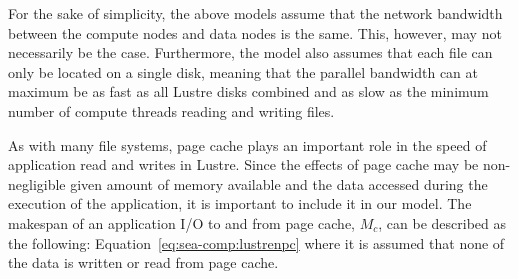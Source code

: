



      For the sake of simplicity, the above models assume that the network
      bandwidth between the compute nodes and data nodes is the same. This,
      however, may not necessarily be the case. Furthermore, the model also
      assumes that each file can only be located on a single disk, meaning that
      the parallel bandwidth can at maximum be as fast as all Lustre disks
      combined and as slow as the minimum number of compute threads reading and
      writing files.

      As with many file systems, page cache plays an important role in the speed
      of application read and writes in Lustre. Since the effects of page cache
      may be non-negligible given amount of memory available and the data
      accessed during the execution of the application, it is important to
      include it in our model. The makespan of an application I/O to and from
      page cache, $M_{c}$, can be described as the following:
      Equation~\ref{eq:sea-comp:lustrenpc} where it is assumed that none of the
      data is written or read from page cache.


